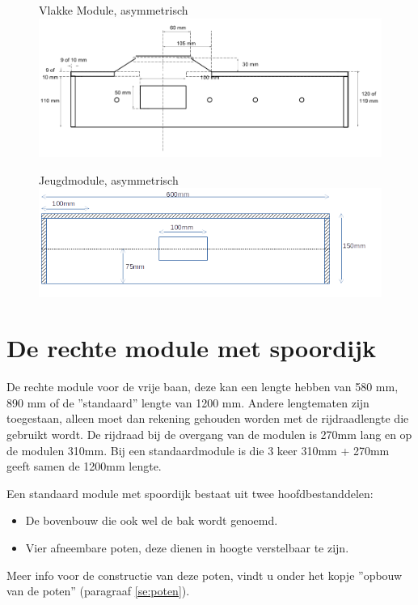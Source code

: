 \documentclass[12pt,a4paper]{report}
\begin{document}
\begin{figure}[ht]
  \captionbox
  {Vlakke Module, asymmetrisch}
  {\includegraphics[scale=0.25]{images/rcu_vlak_asym}}
\end{figure}

\begin{figure}[!ht]
  \captionbox
  {Jeugdmodule, asymmetrisch\label{im:jeugdbak}}
  {\includegraphics[scale=0.9]{images/jeugdbak}}
\end{figure}

\section{De rechte module met spoordijk}
De rechte module voor de vrije baan, deze kan een lengte hebben van 580 mm, 890 mm of de ''standaard'' lengte van 1200 mm.
Andere lengtematen zijn toegestaan, alleen moet dan rekening gehouden worden met de rijdraadlengte die gebruikt wordt. De rijdraad bij de overgang van de modulen is 270mm lang en op de modulen 310mm.
Bij een standaardmodule is die 3 keer 310mm + 270mm geeft samen de 1200mm lengte.

Een standaard module met spoordijk bestaat uit twee hoofdbestanddelen:
\begin{itemize}
\item De bovenbouw die ook wel de bak wordt genoemd.
\item Vier afneembare poten, deze dienen in hoogte verstelbaar te zijn.
\end{itemize}
Meer info voor de constructie van deze poten, vindt u onder het kopje ''opbouw van de poten'' (paragraaf \ref{se:poten}).
\end{document}
